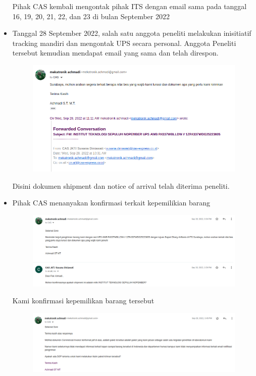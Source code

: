 \documentclass{article} %
\begin{document}
\begin{itemize}
		Pihak CAS kembali mengontak pihak ITS dengan email sama pada tanggal 16, 19, 20, 21, 22, dan 23 di bulan September 2022
		
		\newpage
		\item Tanggal 28 September 2022, salah satu anggota peneliti melakukan inisitiatif tracking mandiri dan mengontak UPS secara personal.
		Anggota Peneliti tersebut kemudian mendapat email yang sama dan telah direspon.
		
		\begin{figure}[!ht]
			\centering
			\includegraphics[width=400pt]{images/impor_3}
		\end{figure}
	
		Disini dokumen shipment dan notice of arrival telah diterima peneliti.
	
		\item Pihak CAS menanyakan konfirmasi terkait kepemilikian barang
		
		\begin{figure}[!ht]
			\centering
			\includegraphics[width=400pt]{images/impor_4}
		\end{figure}
	
		Kami konfirmasi kepemilikan barang tersebut
		
		\begin{figure}[!ht]
			\centering
			\includegraphics[width=400pt]{images/impor_5}
		\end{figure}
	

\end{itemize}
\end{document}
